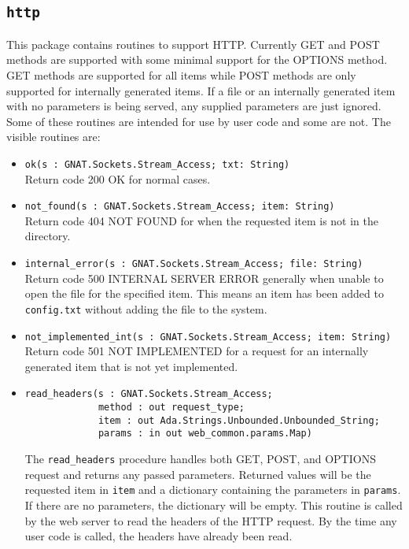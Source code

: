 \documentclass[10pt, openany, draft]{article}
\begin{document}
\subsection{\texttt{http}}
This package contains routines to support HTTP.  Currently GET and POST methods are supported with some minimal support for the OPTIONS method.  GET methods are supported for all items while POST methods are only supported for internally generated items.  If a file or an internally generated item with no parameters is being served, any supplied parameters are just ignored. Some of these routines are intended for use by user code and some are not.  The visible routines are:
\begin{itemize}
  \item \verb|ok(s : GNAT.Sockets.Stream_Access; txt: String)|\\
  Return code 200 OK for normal cases.
  \item \verb|not_found(s : GNAT.Sockets.Stream_Access; item: String)|\\
  Return code 404 NOT FOUND for when the requested item is not in the directory.
  \item \verb|internal_error(s : GNAT.Sockets.Stream_Access; file: String)|\\
  Return code 500 INTERNAL SERVER ERROR generally when unable to open the file for the specified item.  This means an item has been added to \texttt{config.txt} without adding the file to the system.
  \item \verb|not_implemented_int(s : GNAT.Sockets.Stream_Access; item: String)|\\
  Return code 501 NOT IMPLEMENTED for a request for an internally generated item that is not yet implemented.
  \item \begin{verbatim}read_headers(s : GNAT.Sockets.Stream_Access;
             method : out request_type;
             item : out Ada.Strings.Unbounded.Unbounded_String;
             params : in out web_common.params.Map)
            \end{verbatim}
   The \texttt{read\_headers} procedure handles both GET, POST, and OPTIONS request and returns any passed parameters.  Returned values will be the requested item in \texttt{item} and a dictionary containing the parameters in \texttt{params}.  If there are no parameters, the dictionary will be empty.  This routine is called by the web server to read the headers of the HTTP request.  By the time any user code is called, the headers have already been read.
\end{itemize}
\end{document}
